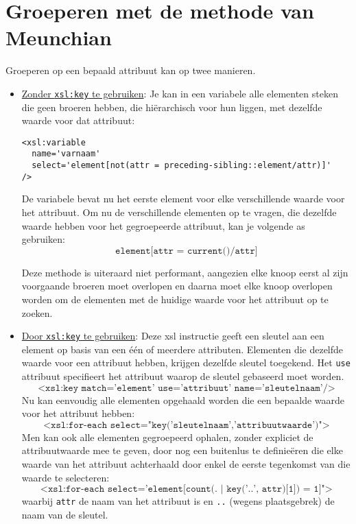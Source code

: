 \documentclass{report}
\begin{document}
	\section{Groeperen met de methode van Meunchian}
	Groeperen op een bepaald attribuut kan op twee manieren. 
	\begin{itemize}
		\item \underline{Zonder \texttt{xsl:key} te gebruiken}: 
			Je kan in een variabele alle elementen steken die geen broeren hebben, die hiërarchisch voor hun liggen, met dezelfde waarde voor dat attribuut:
			\begin{lstlisting}
<xsl:variable 
  name='varnaam' 
  select='element[not(attr = preceding-sibling::element/attr)]'
/>
			\end{lstlisting}
			De variabele bevat nu het eerste element voor elke verschillende waarde voor het attribuut. Om nu de verschillende elementen op te vragen, die dezelfde waarde hebben voor het gegroepeerde attribuut, kan je volgende as gebruiken:
			$$\texttt{element[attr = current()/attr]}$$
			
			Deze methode is uiteraard niet performant, aangezien elke knoop eerst al zijn voorgaande broeren moet overlopen en daarna moet elke knoop overlopen worden om de elementen met de huidige waarde voor het attribuut op te zoeken.
		\item \underline{Door \texttt{xsl:key} te gebruiken}: 
			Deze xsl instructie geeft een sleutel aan een element op basis van een één of meerdere attributen. Elementen die dezelfde waarde voor een attribuut hebben, krijgen dezelfde sleutel toegekend. Het \texttt{use} attribuut specifieert het attribuut waarop de sleutel gebaseerd moet worden.
			$$\texttt{<xsl:key match='element' use='attribuut' name='sleutelnaam'/>}$$
			Nu kan eenvoudig alle elementen opgehaald worden die een bepaalde waarde voor het attribuut hebben:
			$$\texttt{<xsl:for-each select="key('sleutelnaam','attribuutwaarde')">}$$
			Men kan ook alle elementen gegroepeerd ophalen, zonder expliciet de attribuutwaarde mee te geven, door nog een buitenlus te definieëren die elke waarde van het attribuut achterhaald door enkel de eerste tegenkomst van die waarde te selecteren:
			$$\texttt{<xsl:for-each select='element[count(. | key('..', attr)[1]) = 1]">}$$
			waarbij \texttt{attr} de naam van het attribuut is en \texttt{..} (wegens plaatsgebrek) de naam van de sleutel.


	\end{itemize}
\end{document}

